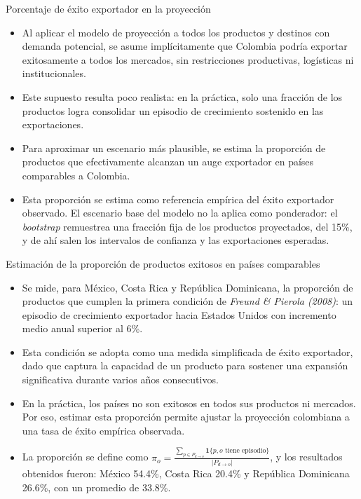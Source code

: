 \documentclass[aspectratio=169,xcolor=dvipsnames]{beamer}
\begin{document}
\begin{frame}{Porcentaje de éxito exportador en la proyección}
    \begin{itemize}
        \item Al aplicar el modelo de proyección a todos los productos y destinos con demanda potencial, se asume implícitamente que Colombia podría exportar exitosamente a todos los mercados, sin restricciones productivas, logísticas ni institucionales.
        \item Este supuesto resulta poco realista: en la práctica, solo una fracción de los productos logra consolidar un episodio de crecimiento sostenido en las exportaciones.
        \item Para aproximar un escenario más plausible, se estima la {proporción de productos que efectivamente alcanzan un auge exportador} en países comparables a Colombia.
        \item Esta proporción se estima como referencia empírica del éxito exportador observado. El escenario base del modelo no la aplica como ponderador: el \textit{bootstrap} remuestrea una fracción fija de los productos proyectados, del 15\%, y de ahí salen los {intervalos de confianza y las exportaciones esperadas}.
    \end{itemize}
\end{frame}


\begin{frame}{Estimación de la proporción de productos exitosos en países comparables}
    \begin{itemize}
        \item Se mide, para México, Costa Rica y República Dominicana, la proporción de productos que cumplen la primera condición de \textit{Freund \& Pierola (2008)}: un episodio de crecimiento exportador hacia Estados Unidos con incremento medio anual superior al 6\%.
        \item Esta condición se adopta como una {medida simplificada de éxito exportador}, dado que captura la capacidad de un producto para sostener una expansión significativa durante varios años consecutivos.
        \item En la práctica, los países no son exitosos en todos sus productos ni mercados. Por eso, estimar esta proporción permite ajustar la proyección colombiana a una {tasa de éxito empírica observada}.
        \item La proporción se define como \(\pi_o = \frac{\sum_{p \in P_{d \rightarrow o}} \mathbf{1}\{p,o \text{ tiene episodio}\}}{|P_{d \rightarrow o}|}\), y los resultados obtenidos fueron: México 54.4\%, Costa Rica 20.4\% y República Dominicana 26.6\%, con un promedio de 33.8\%.
    \end{itemize}
\end{frame}
\end{document}
